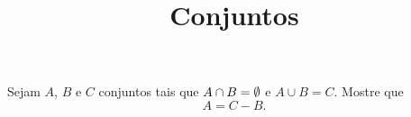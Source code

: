 \documentclass{beamer}
\title{Conjuntos}
\author[\autor]{\autor}
\institute[\instituto]{\instituto}
\date{}
\begin{document}
    \begin{frame}
        \maketitle
    \end{frame}


    \begin{frame}
        \begin{exercicio}
            Sejam $A$, $B$ e $C$ conjuntos tais que $A \cap B = \emptyset$ e $A \cup B = C$. Mostre que
            \[
                A = C - B.
            \]
        \end{exercicio}

        \vspace{6cm}
    \end{frame}
\end{document}
